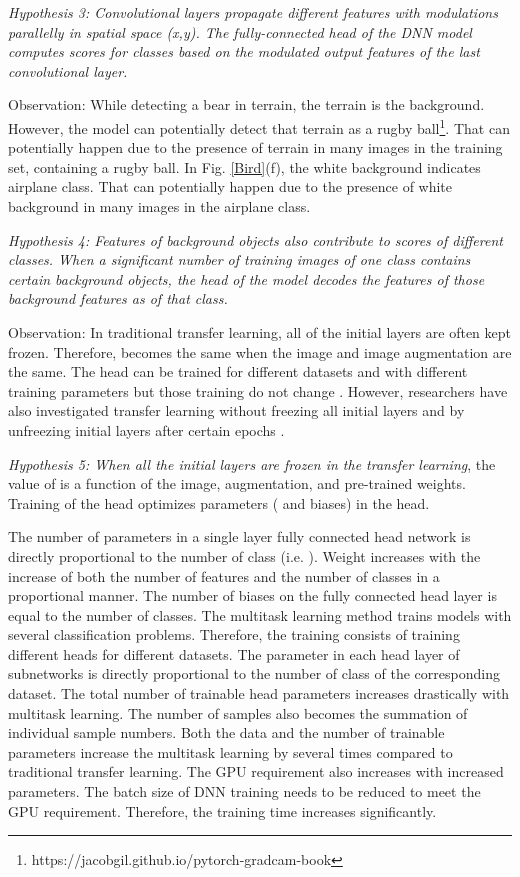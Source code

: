 \documentclass{article}
\begin{document}
\emph{Hypothesis 3: Convolutional layers propagate different features with modulations parallelly in spatial space (x,y). The fully-connected head of the DNN model computes scores for classes based on the modulated output features of the last convolutional layer.}


Observation: While detecting a bear in terrain, the terrain is the background. However, the model can potentially detect that terrain as a rugby ball\footnote{https://jacobgil.github.io/pytorch-gradcam-book}. That can potentially happen due to the presence of terrain in many images in the training set, containing a rugby ball. In Fig. \ref{Bird}(f), the white background indicates airplane class. That can potentially happen due to the presence of white background in many images in the airplane class.

\emph{Hypothesis 4: Features of background objects also contribute to scores of different classes. When a significant number of training images of one class contains certain background objects, the head of the model decodes the features of those background features as of that class.}

Observation: In traditional transfer learning, all of the initial layers are often kept frozen. Therefore,  becomes the same when the image and image augmentation are the same. The head can be trained for different datasets and with different training parameters but those training do not change . However, researchers have also investigated transfer learning without freezing all initial layers and by unfreezing initial layers after certain epochs \cite{goodfellow2016deep, guo2019spottune}.

\emph{Hypothesis 5: When all the initial layers are frozen in the transfer learning}, the value of  is a function of the image, augmentation, and pre-trained weights. Training of the head optimizes parameters ( and biases) in the head.



The number of parameters in a single layer fully connected head network  is directly proportional to the number of class  (i.e. ). Weight increases with the increase of both the number of features and the number of classes in a proportional manner. The number of biases on the fully connected head layer is equal to the number of classes. 
The multitask learning method trains models with several classification problems. Therefore, the training consists of training different heads for different datasets. The parameter in each head layer of subnetworks  is directly proportional to the number of class  of the corresponding dataset. The total number of trainable head parameters increases drastically with multitask learning. The number of samples also becomes the summation of individual sample numbers. Both the data and the number of trainable parameters increase the multitask learning by several times compared to traditional transfer learning. The GPU requirement also increases with increased parameters. The batch size of DNN training needs to be reduced to meet the GPU requirement. Therefore, the training time increases significantly.
\end{document}
